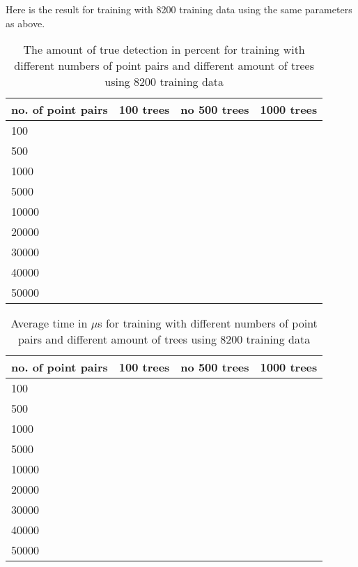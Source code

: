 Here is the result for training with 8200 training data using the same parameters as above.

\begin{table}[H]
\begin{center}
     \begin{tabular}{ | l | l | l | l | }
     \hline
     no. of point pairs & 100 trees & no 500 trees & 1000 trees \\ \hline
   	 100 &  &  &  	\\ \hline
     500 &  &  &  	\\ \hline
     1000 & & &  \\ \hline
     5000 & & & 	\\ \hline
     10000 & & & 	\\ \hline
     20000 & & & 	\\ \hline
     30000 & & & 	\\ \hline
     40000 & & & 	\\ \hline
     50000 & & & 	\\ \hline
     \end{tabular}
\end{center}
\caption{The amount of true detection in percent for training with different numbers of point pairs and different amount of trees using 8200 training data}
\end{table}


\begin{table}[H]
\begin{center}
     \begin{tabular}{ | l | l | l | l | }
     \hline
     no. of point pairs & 100 trees & no 500 trees & 1000 trees \\ \hline
   	 100 & & &  	\\ \hline
     500 & & &  	\\ \hline
     1000 & & &  \\ \hline
     5000 & & & 	\\ \hline
     10000 & & & 	\\ \hline
     20000 & & & 	\\ \hline
     30000 & & & 	\\ \hline
     40000 & & & 	\\ \hline
     50000 & & & 	\\ \hline
     \end{tabular}
\end{center}
\caption{Average time in $\mu$s for training with different numbers of point pairs and different amount of trees using 8200 training data}
\end{table}

